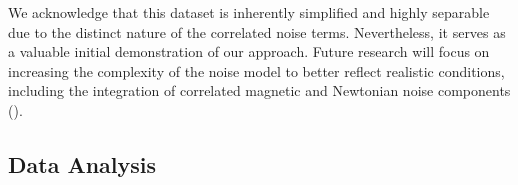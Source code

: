 \documentclass[%
 reprint,
 amsmath,amssymb,
 aps,
 nofootinbib,
]{revtex4-2}
\begin{document}
We acknowledge that this dataset is inherently simplified and highly separable due to the distinct nature of the correlated noise terms. 
Nevertheless, it serves as a valuable initial demonstration of our approach. 
Future research will focus on increasing the complexity of the noise model to better reflect realistic conditions, including the integration of correlated magnetic and Newtonian noise components ().

\subsection{Data Analysis}



\end{document}
